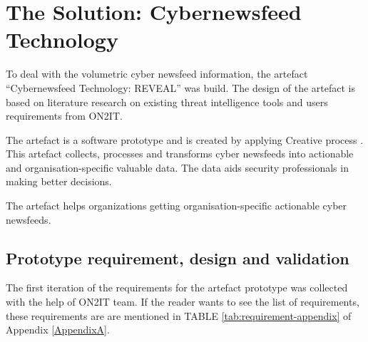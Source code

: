  





\section*{The Solution: Cybernewsfeed Technology }

To deal with the volumetric cyber newsfeed information, the artefact \enquote{Cybernewsfeed Technology: REVEAL} was build. The design of the artefact is based on literature research on existing threat intelligence tools and users requirements from ON2IT.

The artefact is a software prototype and is created by applying Creative process
\citep{mednick1962associative}.
This artefact collects, processes and transforms cyber newsfeeds into actionable and organisation-specific valuable data. The data aids security professionals in making better decisions.

The artefact helps  organizations getting organisation-specific  actionable  cyber newsfeeds. 


\subsection*{Prototype requirement, design and validation}

The first iteration of the requirements for the artefact prototype was collected with the help of ON2IT team. If the reader wants to see the list of requirements, these requirements are are mentioned in TABLE  \ref{tab:requirement-appendix} of Appendix \ref{AppendixA}.

